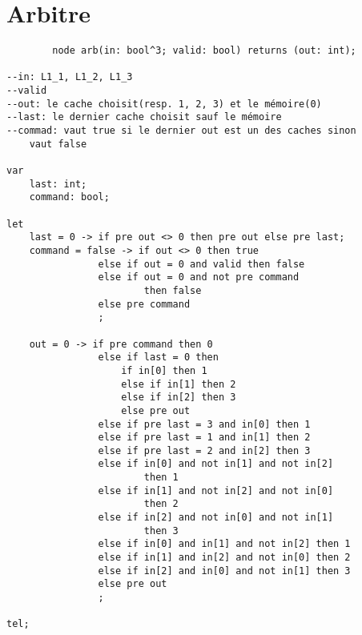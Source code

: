 \documentclass[a4paper,11pt]{report}
\begin{document}
\chapter{Arbitre}
	\begin{framed}
		\begin{verbatim}
		node arb(in: bool^3; valid: bool) returns (out: int);

--in: L1_1, L1_2, L1_3
--valid
--out: le cache choisit(resp. 1, 2, 3) et le mémoire(0)
--last: le dernier cache choisit sauf le mémoire
--commad: vaut true si le dernier out est un des caches sinon 
	vaut false

var
    last: int;
    command: bool;

let
    last = 0 -> if pre out <> 0 then pre out else pre last;
    command = false -> if out <> 0 then true
                else if out = 0 and valid then false
                else if out = 0 and not pre command 
                		then false
                else pre command
                ;

    out = 0 -> if pre command then 0
                else if last = 0 then
                    if in[0] then 1
                    else if in[1] then 2
                    else if in[2] then 3
                    else pre out
                else if pre last = 3 and in[0] then 1
                else if pre last = 1 and in[1] then 2
                else if pre last = 2 and in[2] then 3
                else if in[0] and not in[1] and not in[2] 
                		then 1
                else if in[1] and not in[2] and not in[0] 
                		then 2
                else if in[2] and not in[0] and not in[1] 
                		then 3
                else if in[0] and in[1] and not in[2] then 1
                else if in[1] and in[2] and not in[0] then 2
                else if in[2] and in[0] and not in[1] then 3
                else pre out
                ;

tel;
		\end{verbatim}
	\end{framed}
\end{document}
